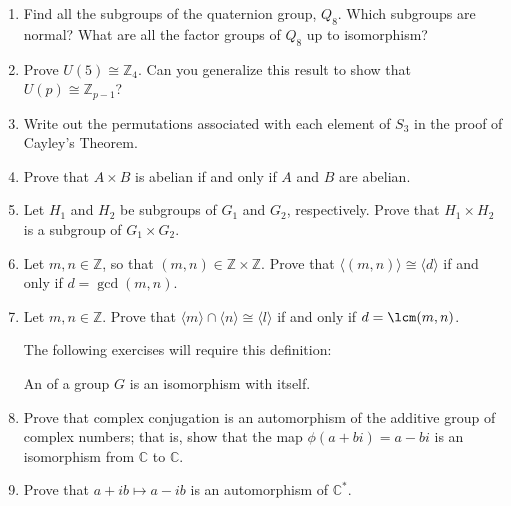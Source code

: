 {\begin{enumerate}[(1)]
\item
Find all the subgroups of the quaternion group, $Q_8$. Which subgroups
are normal? What are all the factor groups of $Q_8$ up to isomorphism?


 

 \item
Prove $U(5) \cong {\mathbb Z}_4$. Can you generalize this result to show
that $U(p) \cong {\mathbb Z}_{p-1}$? 
 

\item
Write out the permutations associated with each element of $S_3$ in
the proof of Cayley's Theorem. 


\item
Prove that $A \times B$ is abelian if and only if $A$ and $B$ are
abelian. 
 

 

\item
Let $H_1$ and $H_2$ be subgroups of $G_1$ and $G_2$, respectively. Prove that $H_1 \times H_2$ is a subgroup of $G_1 \times G_2$. 
 

\item
Let $m, n \in {\mathbb Z}$, so that $(m,n) \in \mathbb{Z} \times \mathbb{Z}$. Prove that $\langle (m,n) \rangle \cong \langle d \rangle$ if and only if $d = \gcd(m,n)$.
 

\item
Let $m, n \in {\mathbb Z}$. Prove that $\langle m \rangle \cap \langle n \rangle \cong \langle l \rangle$ if and only if $d = \lcm(m,n)$. 

 \bigskip

\bigskip
 

\noindent
The following exercises  will require this definition:

\begin{defn}
 An  of a group $G$ is an isomorphism
with itself. 
\end{defn}

\item
Prove that complex conjugation is an automorphism of the
additive group of complex numbers; that is, show that the map $\phi(
a + bi ) = a - bi$ is an isomorphism from ${\mathbb C}$ to ${\mathbb C}$. 
 

\item
Prove that $a + ib \mapsto a - ib$ is an automorphism of ${\mathbb C}^*$. 
 


\end{enumerate}}
